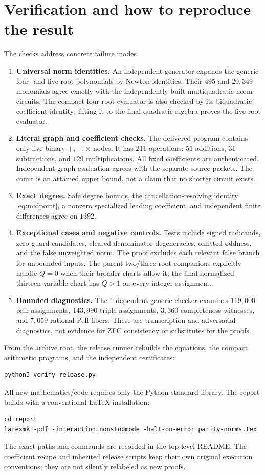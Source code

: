 \documentclass[11pt]{article}
\theoremstyle{remark}
\begin{document}
\section{Verification and how to reproduce the result}

The checks address concrete failure modes.

\begin{enumerate}
\item \textbf{Universal norm identities.}
An independent generator expands the generic four- and five-root
polynomials by Newton identities. Their \(495\) and \(20{,}349\) monomials
agree exactly with the independently built multiquadratic norm circuits.
The compact four-root evaluator is also checked by its biquadratic
coefficient identity; lifting it to the final quadratic algebra proves
the five-root evaluator.
\item \textbf{Literal graph and coefficient checks.}
The delivered program contains only live binary \(+,-,\times\) nodes.
It has \(211\) operations: \(51\) additions, \(31\) subtractions,
and \(129\) multiplications. All fixed coefficients are authenticated.
Independent graph evaluation agrees with the separate source packets.
The count is an attained upper bound, not a claim that no shorter circuit
exists.
\item \textbf{Exact degree.}
Safe degree bounds, the cancellation-resolving identity
\eqref{eq:midpoint}, a nonzero specialized leading coefficient, and
independent finite differences agree on \(1392\).
\item \textbf{Exceptional cases and negative controls.}
Tests include signed radicands, zero guard candidates, cleared-denominator
degeneracies, omitted oddness, and the false unweighted norm.
The proof excludes each relevant false branch for unbounded inputs.
The parent two/three-root companions explicitly handle \(Q=0\) when their
broader charts allow it; the final normalized thirteen-variable chart has
\(Q>1\) on every integer assignment.
\item \textbf{Bounded diagnostics.}
The independent generic checker examines \(119{,}000\) pair assignments,
\(143{,}990\) triple assignments, \(3{,}360\) completeness witnesses, and
\(7{,}059\) rational-Pell fibers. These are transcription and adversarial
diagnostics, not evidence for ZFC consistency or substitutes for the proofs.
\end{enumerate}

From the archive root, the release runner rebuilds the equations,
the compact arithmetic programs, and the independent certificates:
\begin{lstlisting}
python3 verify_release.py
\end{lstlisting}
All new mathematics/code requires only the Python standard library.
The report builds with a conventional LaTeX installation:
\begin{lstlisting}
cd report
latexmk -pdf -interaction=nonstopmode -halt-on-error parity-norms.tex
\end{lstlisting}
The exact paths and commands are recorded in the top-level README.
The coefficient recipe and inherited release scripts keep their own
original execution conventions; they are not silently relabeled as new
proofs.
\end{document}
